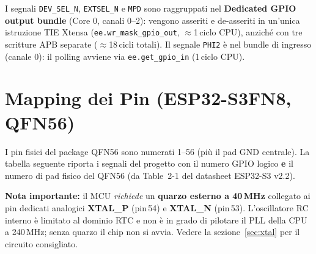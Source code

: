 \documentclass[12pt, a4paper]{article}
\begin{document}
I segnali \texttt{DEV\_SEL\_N}, \texttt{EXTSEL\_N} e \texttt{MPD} sono raggruppati nel \textbf{Dedicated GPIO output bundle} (Core 0, canali 0--2): vengono asseriti e de-asseriti in un'unica istruzione TIE Xtensa (\texttt{ee.wr\_mask\_gpio\_out}, $\approx$1\,ciclo CPU), anziché con tre scritture APB separate ($\approx$18\,cicli totali). Il segnale \texttt{PHI2} è nel bundle di ingresso (canale 0): il polling avviene via \texttt{ee.get\_gpio\_in} (1\,ciclo CPU).

\section{Mapping dei Pin (ESP32-S3FN8, QFN56)}

I pin fisici del package QFN56 sono numerati 1--56 (più il pad GND centrale). La tabella seguente riporta i segnali del progetto con il numero GPIO logico \textbf{e} il numero di pad fisico del QFN56 (da Table~2-1 del datasheet ESP32-S3 v2.2).

\textbf{Nota importante:} il MCU \emph{richiede} un \textbf{quarzo esterno a 40\,MHz} collegato ai pin dedicati analogici \textbf{XTAL\_P} (pin\,54) e \textbf{XTAL\_N} (pin\,53). L'oscillatore RC interno è limitato al dominio RTC e non è in grado di pilotare il PLL della CPU a 240\,MHz; senza quarzo il chip non si avvia. Vedere la sezione~\ref{sec:xtal} per il circuito consigliato.
\end{document}
